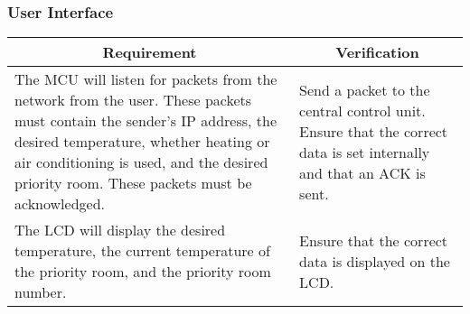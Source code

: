 \subsubsection{User Interface}
\begin{tabular}{|p{\mytabwidth}|p{\mytabwidth}|}
\hline
\multicolumn{1}{|c|}{Requirement} & \multicolumn{1}{|c|}{Verification} \\
\hline\hline
The MCU will listen for packets from the network from the user.  These packets must contain the sender's IP address, the desired temperature, whether heating or air conditioning is used, and the desired priority room.  These packets must be acknowledged. &
Send a packet to the central control unit.  Ensure that the correct data is set internally and that an ACK is sent. \\
\hline
The LCD will display the desired temperature, the current temperature of the priority room, and the priority room number. &
Ensure that the correct data is displayed on the LCD. \\
\hline
\end{tabular}

